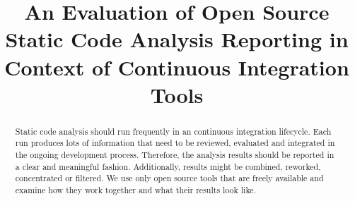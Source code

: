 \documentclass[conference]{IEEEtran}
\begin{document}
%
\title{An Evaluation of Open Source Static Code Analysis Reporting in Context of Continuous Integration Tools}






\author{
	}








\maketitle


\begin{abstract}
Static code analysis should run frequently in an continuous integration lifecycle. Each run produces lots of information that need to be reviewed, evaluated and integrated in the ongoing development process. Therefore, the analysis results should be reported in a clear and meaningful fashion. Additionally, results might be combined, reworked, concentrated or filtered. We use only open source tools that are freely available and examine how they work together and what their results look like.
\end{abstract}


\IEEEpeerreviewmaketitle
\end{document}

